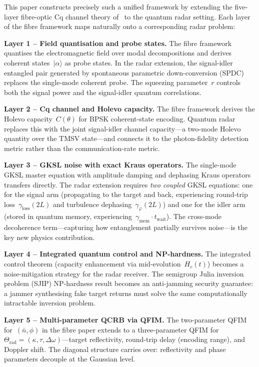 \documentclass[journal]{IEEEtran}
\begin{document}
This paper constructs precisely such a unified framework by extending the five-layer fibre-optic Cq channel theory of~\cite{gautum2024rigorous} to the quantum radar setting. Each layer of the fibre framework maps naturally onto a corresponding radar problem:

\textbf{Layer 1 -- Field quantisation and probe states.} The fibre framework quantises the electromagnetic field over modal decompositions and derives coherent states~$|\alpha\rangle$ as probe states. In the radar extension, the signal-idler entangled pair generated by spontaneous parametric down-conversion (SPDC) replaces the single-mode coherent probe. The squeezing parameter~$r$ controls both the signal power and the signal-idler quantum correlations.

\textbf{Layer 2 -- Cq channel and Holevo capacity.} The fibre framework derives the Holevo capacity~$C(\theta)$ for BPSK coherent-state encoding. Quantum radar replaces this with the joint signal-idler channel capacity---a two-mode Holevo quantity over the TMSV state---and connects it to the photon-fidelity detection metric rather than the communication-rate metric.

\textbf{Layer 3 -- GKSL noise with exact Kraus operators.} The single-mode GKSL master equation with amplitude damping and dephasing Kraus operators transfers directly. The radar extension requires \textit{two coupled} GKSL equations: one for the signal arm (propagating to the target and back, experiencing round-trip loss~$\gamma_{\text{loss}}(2L)$ and turbulence dephasing~$\gamma_{\varphi}(2L)$) and one for the idler arm (stored in quantum memory, experiencing~$\gamma_{\text{mem}} \cdot t_{\text{wait}}$). The cross-mode decoherence term---capturing how entanglement partially survives noise---is the key new physics contribution.

\textbf{Layer 4 -- Integrated quantum control and NP-hardness.} The integrated control theorem (capacity enhancement via mid-evolution~$H_c(t)$) becomes a noise-mitigation strategy for the radar receiver. The semigroup Julia inversion problem (SJIP) NP-hardness result becomes an anti-jamming security guarantee: a jammer synthesising fake target returns must solve the same computationally intractable inversion problem.

\textbf{Layer 5 -- Multi-parameter QCRB via QFIM.} The two-parameter QFIM for~$(\bar{n}, \phi)$ in the fibre paper extends to a three-parameter QFIM for~$\Theta_{\text{rad}} = (\kappa, \tau, \Delta\omega)$---target reflectivity, round-trip delay (encoding range), and Doppler shift. The diagonal structure carries over: reflectivity and phase parameters decouple at the Gaussian level.
\end{document}
